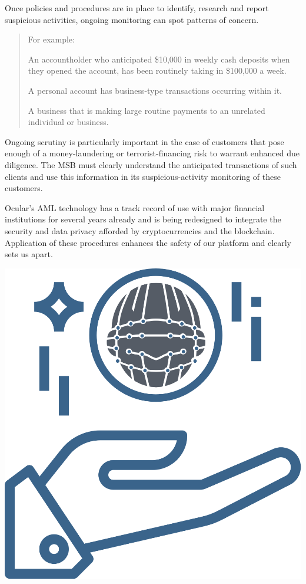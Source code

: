 \documentclass[a4paper]{article}
\let\tempone\itemize
\let\temptwo\enditemize
\renewenvironment{itemize}{\tempone\addtolength{\itemsep}{-5pt}}{\temptwo}
\begin{document}
Once policies and procedures are in place to identify, research and report suspicious activities, ongoing monitoring can spot patterns of concern. 
\begin{quotation}For example:
\begin{itemize}
  \item An accountholder who anticipated \$10,000 in weekly cash deposits when they opened the account, has been routinely taking in \$100,000 a week.
  \item A personal account has business-type transactions occurring within it.
  \item A business that is making large routine payments to an unrelated individual or business.
\end{itemize}
\end{quotation}

Ongoing scrutiny is particularly important in the case of customers that pose enough of a money-laundering or terrorist-financing risk to warrant enhanced due diligence. The MSB must clearly understand the anticipated transactions of such clients and use this information in its suspicious-activity monitoring of these customers.

Ocular's AML technology has a track record of use with major financial institutions for several years already and is being redesigned to integrate the security and data privacy afforded by cryptocurrencies and the blockchain. Application of these procedures enhances the safety of our platform and clearly sets us apart.
\newpage


\centerline{\includegraphics[width=1.0\textwidth]{ocular-pos}}
\end{document}
